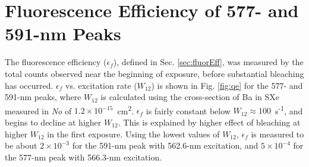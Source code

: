 


\section{Fluorescence Efficiency of 577- and 591-nm Peaks}

The fluorescence efficiency ($\epsilon_{f}$), defined in Sec. \ref{sec:fluorEff}, was measured by the total counts observed near the beginning of exposure, before substantial bleaching has occurred. $\epsilon_{f}$ vs. excitation rate ($W_{12}$) is shown in Fig. \ref{fig:qe} for the 577- and 591-nm peaks, where $W_{12}$ is calculated using the cross-section of Ba in SXe measured in \emph{\color{gray}No} \cite{Brian} of $1.2 \times 10^{-15}$~cm\textsuperscript{2}.  $\epsilon_{f}$ is fairly constant below $W_{12} \approx 100$~s\textsuperscript{-1}, and begins to decline at higher $W_{12}$.  This is explained by higher effect of bleaching at higher $W_{12}$ in the first exposure.  Using the lowest values of $W_{12}$, $\epsilon_{f}$ is measured to be about $2 \times 10^{-3}$ for the 591-nm peak with 562.6-nm excitation, and $5 \times 10^{-4}$ for the 577-nm peak with 566.3-nm excitation.


